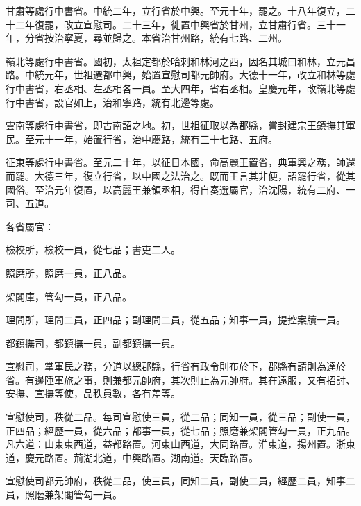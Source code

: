 \begin{pinyinscope}
 甘肅等處行中書省。中統二年，立行省於中興。至元十年，罷之。十八年復立，二十二年復罷，改立宣慰司。二十三年，徙置中興省於甘州，立甘肅行省。三十一年，分省按治寧夏，尋並歸之。本省治甘州路，統有七路、二州。



 嶺北等處行中書省。國初，太祖定都於哈剌和林河之西，因名其城曰和林，立元昌路。中統元年，世祖遷都中興，始置宣慰司都元帥府。大德十一年，改立和林等處行中書省，右丞相、左丞相各一員。至大四年，省右丞相。皇慶元年，改嶺北等處行中書省，設官如上，治和寧路，統有北邊等處。



 雲南等處行中書省，即古南詔之地。初，世祖征取以為郡縣，嘗封建宗王鎮撫其軍民。至元十一年，始置行省，治中慶路，統有三十七路、五府。



 征東等處行中書省。至元二十年，以征日本國，命高麗王置省，典軍興之務，師還而罷。大德三年，復立行省，以中國之法治之。既而王言其非便，詔罷行省，從其國俗。至治元年復置，以高麗王兼領丞相，得自奏選屬官，治沈陽，統有二府、一司、五道。



 各省屬官：



 檢校所，檢校一員，從七品；書吏二人。



 照磨所，照磨一員，正八品。



 架閣庫，管勾一員，正八品。



 理問所，理問二員，正四品；副理問二員，從五品；知事一員，提控案牘一員。



 都鎮撫司，都鎮撫一員，副都鎮撫一員。



 宣慰司，掌軍民之務，分道以總郡縣，行省有政令則布於下，郡縣有請則為達於省。有邊陲軍旅之事，則兼都元帥府，其次則止為元帥府。其在遠服，又有招討、安撫、宣撫等使，品秩員數，各有差等。



 宣慰使司，秩從二品。每司宣慰使三員，從二品；同知一員，從三品；副使一員，正四品；經歷一員，從六品；都事一員，從七品；照磨兼架閣管勾一員，正九品。凡六道：山東東西道，益都路置。河東山西道，大同路置。淮東道，揚州置。浙東道，慶元路置。荊湖北道，中興路置。湖南道。天臨路置。



 宣慰使司都元帥府，秩從二品，使三員，同知二員，副使二員，經歷二員，知事二員，照磨兼架閣管勾一員。




\end{pinyinscope}
